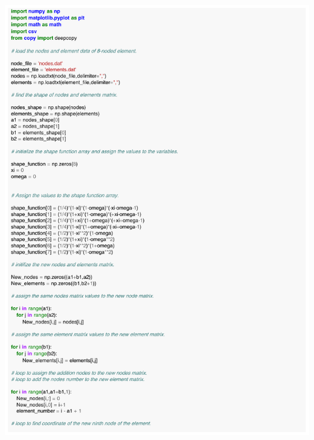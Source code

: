 \documentclass[12pt]{article}
\begin{document}
\begin{appendices}
\includegraphics[scale=0.80,page=2]{9Node_Mesh_generation.pdf}

\end{appendices}
\end{document}

